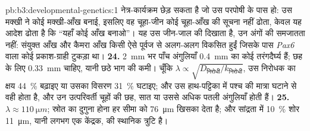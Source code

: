 \begin{solution}{pb:b3:developmental-genetics:1}
नेत्र-कार्यक्रम छेड़ सकता है जो उस परपोषी के पास हो: उस मक्खी ने कोई
मक्खी-आँख बनाई, इसलिए वह चूहा-जीन कोई चूहा-आँख की सूचना नहीं ढोता, केवल
यह आदेश ढोता है कि ``यहाँ कोई आँख बनाओ''। यह उस जीन-जाल की 
दिखाता है, उन अंगों की समजातता नहीं: संयुक्त आँख और कैमरा आँख किसी ऐसे
पूर्वज से अलग-अलग विकसित हुईं जिसके पास \emph{Pax6} वाला कोई
प्रकाश-ग्राही टुकड़ा था।
\textbf{24.} \qty{2}{mm} भर पाँच अंगुलियाँ \qty{0.4}{mm} का कोई
तरंगदैर्घ्य हैं; छह के लिए \qty{0.33}{mm} चाहिए, यानी छठे भाग की कमी।
चूँकि $\lambda \propto \sqrt{D_{\text{निरोधी}}/k_{\text{निरोधी}}}$, उस
निरोधक का क्षय \qty{44}{\%} बढ़ाइए या उसका विसरण \qty{31}{\%} घटाइए;
और उस हाथ-पट्टिका में पश्च  की मात्रा घटाने से वही होता है, और
उन उत्परिवर्ती चूहों की छह, सात या उससे अधिक पतली अंगुलियाँ होती हैं।
\textbf{25.} $\lambda \approx \qty{110}{\micro m}$; स्रोत का दुगुना
होना हर सीमा को \qty{76}{\micro m} खिसका देता है; और सांद्रता में
\qty{10}{\%} शोर \qty{11}{\micro m}, यानी लगभग एक केंद्रक, की स्थानिक
त्रुटि है।
\end{solution}
